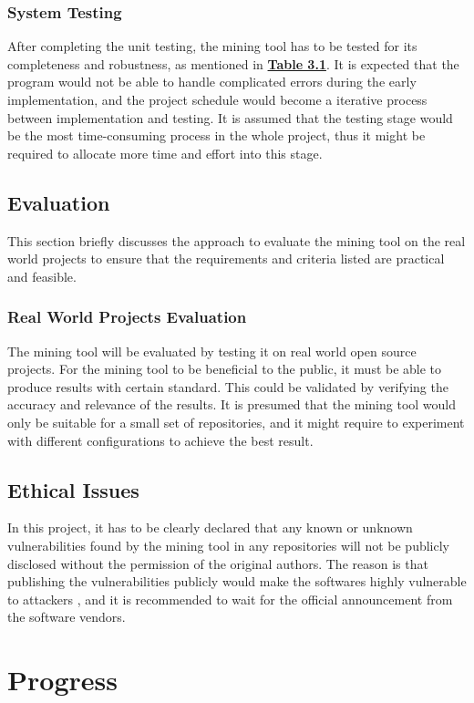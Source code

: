 \documentclass[12pt, a4paper]{report}
\begin{document}
{\subsection{System Testing}
After completing the unit testing, the mining tool has to be tested for its completeness and
robustness, as mentioned in \hyperref[table:criteria]{\textbf{Table 3.1}}. It is expected that the
program would not be able to handle complicated errors during the early implementation, and the
project schedule would become a iterative process between implementation and testing. It is assumed
that the testing stage would be the most time-consuming process in the whole project, thus it might
be required to allocate more time and effort into this stage.

\section{Evaluation}
This section briefly discusses the approach to evaluate the mining tool on the real world projects
to ensure that the requirements and criteria listed are practical and feasible.

\subsection{Real World Projects Evaluation}
The mining tool will be evaluated by testing it on real world open source projects. For the mining
tool to be beneficial to the public, it must be able to produce results with certain standard. This
could be validated by verifying the accuracy and relevance of the results. It is presumed that the
mining tool would only be suitable for a small set of repositories, and it might require to
experiment with different configurations to achieve the best result.

\section{Ethical Issues}
In this project, it has to be clearly declared that any known or unknown vulnerabilities found by
the mining tool in any repositories will not be publicly disclosed without the permission of the
original authors. The reason is that publishing the vulnerabilities publicly would make the
softwares highly vulnerable to attackers \cite{arora_2010}, and it is recommended to wait for the
official announcement from the software vendors.

\chapter*{Progress}

}
\end{document}
